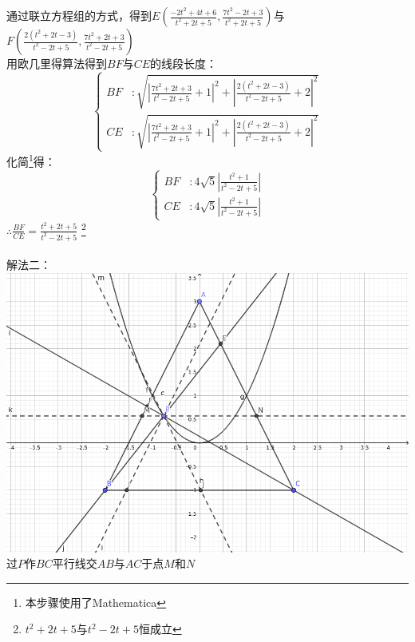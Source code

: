 \documentclass[12pt]{article}
\begin{document}
			通过联立方程组的方式，得到$E(\frac{-2 t^2+4 t+6}{t^2+2 t+5},\frac{7 t^2-2 t+3}{t^2+2 t+5})$与$F(\frac{2 \left(t^2+2 t-3\right)}{t^2-2 t+5},\frac{7 t^2+2 t+3}{t^2-2 t+5})$\\
			用欧几里得算法得到$BF$与$CE$的线段长度：
			\begin{equation}
				\left\{
					\begin{aligned}
						BF&:\sqrt{\left.\left| \frac{7 t^2+2 t+3}{t^2-2 t+5}+1\right.\right| ^2+\left.\left| \frac{2 \left(t^2+2 t-3\right)}{t^2-2 t+5}+2\right.\right| ^2}\\
						CE&:\sqrt{\left.\left| \frac{7 t^2+2 t+3}{t^2-2 t+5}+1\right.\right| ^2+\left.\left| \frac{2 \left(t^2+2 t-3\right)}{t^2-2 t+5}+2\right.\right| ^2}
					\end{aligned}
				\right.
			\end{equation}
			化简\footnote{本步骤使用了Mathematica}得：
			\begin{equation}
				\left\{
					\begin{aligned}
						BF&:4 \sqrt{5} \left.\left| \frac{t^2+1}{t^2-2 t+5}\right.\right|\\
						CE&:4 \sqrt{5} \left.\left| \frac{t^2+1}{t^2-2 t+5}\right.\right|
					\end{aligned}
				\right.
			\end{equation}
			$\therefore{}\frac{BF}{CE}=\frac{t^{2}+2t+5}{t^{2}-2t+5}$ \footnote{$t^{2}+2t+5$与$t^{2}-2t+5$恒成立}\\
			\\
			解法二：\\
			\includegraphics[scale=0.4]{pictures/2017-03-11-1-2004全国赛辅助线.png}\\
			过$P$作$BC$平行线交$AB$与$AC$于点$M$和$N$\\
\end{document}
